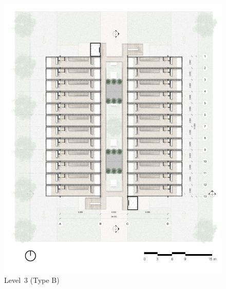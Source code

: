 ﻿%
\begin{figure}[H]
	\centering
	\includegraphics[width=\linewidth]{src/graphics/container-village--level-03.jpg}
	\caption*{%
		Level~3 (Type B)
	}
	\label{
		fig:container-village--level-03
	}
\end{figure}
